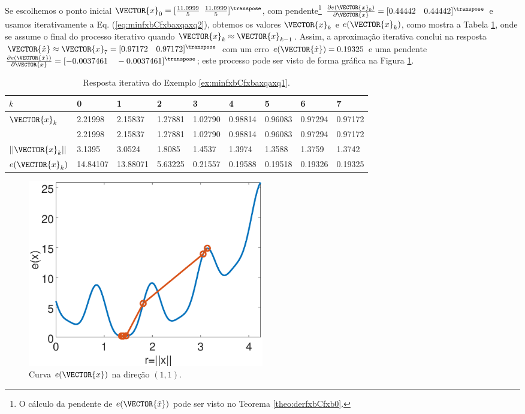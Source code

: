 \begin{SolutionT}
\label{ex:minfxbCfxbaxqaxq3:sol2}
Se escolhemos o ponto inicial $\VECTOR{x}_0=[\frac{11.0999}{5}$ $\frac{11.0999}{5}]^{\transpose}$,
com pendente\footnote{O cálculo da
pendente de $e(\VECTOR{\hat{x}})$ pode ser visto no Teorema \ref{theo:derfxbCfxb0}.} 
$\frac{\partial e(\VECTOR{x}_0)}{\partial \VECTOR{x} }=[0.44442\quad 0.44442]^{\transpose}$ e 
usamos iterativamente a Eq. (\ref{eq:minfxbCfxbaxqaxq2}), obtemos os valores 
$\VECTOR{x}_k$ e $e(\VECTOR{x}_k)$, como mostra a Tabela \ref{table:ex:minfxbCfxbaxqaxq4},
onde se assume o final do processo iterativo quando $\VECTOR{x}_k \approx \VECTOR{x}_{k-1}$.
Assim, a aproximação iterativa conclui na resposta 
$\VECTOR{\hat{x}}\approx \VECTOR{x}_{7} =[0.97172\quad 0.97172]^{\transpose}$
com um erro $e(\VECTOR{\hat{x}})=0.19325$ e uma pendente
$\frac{\partial e(\VECTOR{\hat{x}})}{\partial \VECTOR{x} }=[-0.0037461\quad -0.0037461]^{\transpose}$;
este processo pode ser visto de forma gráfica na Figura \ref{fig:ex:minfxbCfxbaxqaxq4:b}.
\end{SolutionT}


\begin{table}[h!]
\centering
\begin{tabular}{|l|l|l|l|l|l|l|l|l|}
\hline
$k$ & 0 & 1 & 2 & 3 & 4 & 5 & 6 & 7\\ \hline
$\VECTOR{x}_k$ & 2.21998 & 2.15837 & 1.27881 & 1.02790 & 0.98814 & 0.96083 & 0.97294 & 0.97172 \\ 
~              & 2.21998 & 2.15837 & 1.27881 & 1.02790 & 0.98814 & 0.96083 & 0.97294 & 0.97172 \\ \hline
$||\VECTOR{x}_k||$ & 3.1395 & 3.0524 & 1.8085 & 1.4537 & 1.3974 & 1.3588 & 1.3759 & 1.3742 \\ \hline
$e(\VECTOR{x}_k)$ & 14.84107 & 13.88071 & 5.63225 & 0.21557 & 0.19588 & 0.19518 & 0.19326 & 0.19325 \\ \hline
\end{tabular}
\caption{Resposta iterativa do Exemplo \ref{ex:minfxbCfxbaxqaxq1}.}
\label{table:ex:minfxbCfxbaxqaxq4}
\end{table}

     \begin{figure}[!h]
         \centering
         \includegraphics[width=0.5\textwidth]{chapters/minimization-fx/mfiles/fxxq3/plotfx4.eps}
         \caption{Curva $e(\VECTOR{x})$ na direção $(1,1)$.}
         \label{fig:ex:minfxbCfxbaxqaxq4:b}
     \end{figure}


